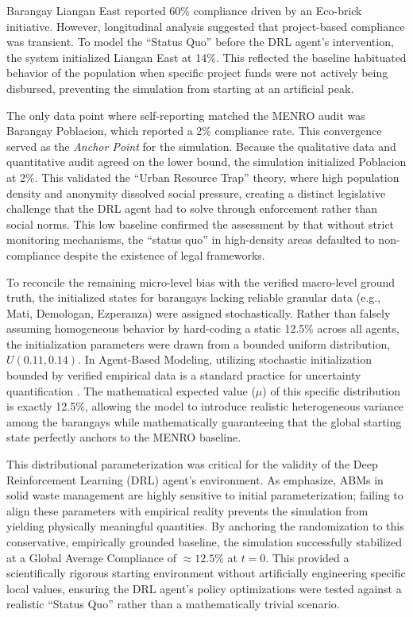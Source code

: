 Barangay Liangan East reported 60\% compliance driven by an Eco-brick initiative. However, longitudinal analysis suggested that project-based compliance was transient. To model the ``Status Quo'' before the DRL agent's intervention, the system initialized Liangan East at 14\%. This reflected the baseline habituated behavior of the population when specific project funds were not actively being disbursed, preventing the simulation from starting at an artificial peak.

The only data point where self-reporting matched the MENRO audit was Barangay Poblacion, which reported a 2\% compliance rate. This convergence served as the \textit{Anchor Point} for the simulation. Because the qualitative data and quantitative audit agreed on the lower bound, the simulation initialized Poblacion at 2\%. This validated the ``Urban Resource Trap'' theory, where high population density and anonymity dissolved social pressure, creating a distinct legislative challenge that the DRL agent had to solve through enforcement rather than social norms. This low baseline confirmed the assessment by \cite{Villanueva2021} that without strict monitoring mechanisms, the ``status quo'' in high-density areas defaulted to non-compliance despite the existence of legal frameworks.

To reconcile the remaining micro-level bias with the verified macro-level ground truth, the initialized states for barangays lacking reliable granular data (e.g., Mati, Demologan, Ezperanza) were assigned stochastically. Rather than falsely assuming homogeneous behavior by hard-coding a static 12.5\% across all agents, the initialization parameters were drawn from a bounded uniform distribution, $U(0.11, 0.14)$.  In Agent-Based Modeling, utilizing stochastic initialization bounded by verified empirical data is a standard practice for uncertainty quantification \citep{McCulloch2022, Fischer2025}. The mathematical expected value ($\mu$) of this specific distribution is exactly 12.5\%, allowing the model to introduce realistic heterogeneous variance among the barangays while mathematically guaranteeing that the global starting state perfectly anchors to the MENRO baseline.

This distributional parameterization was critical for the validity of the Deep Reinforcement Learning (DRL) agent's environment. As \cite{Ding2024} emphasize, ABMs in solid waste management are highly sensitive to initial parameterization; failing to align these parameters with empirical reality prevents the simulation from yielding physically meaningful quantities. By anchoring the randomization to this conservative, empirically grounded baseline, the simulation successfully stabilized at a Global Average Compliance of $\approx 12.5\%$ at $t = 0$. This provided a scientifically rigorous starting environment without artificially engineering specific local values, ensuring the DRL agent’s policy optimizations were tested against a realistic ``Status Quo'' rather than a mathematically trivial scenario.